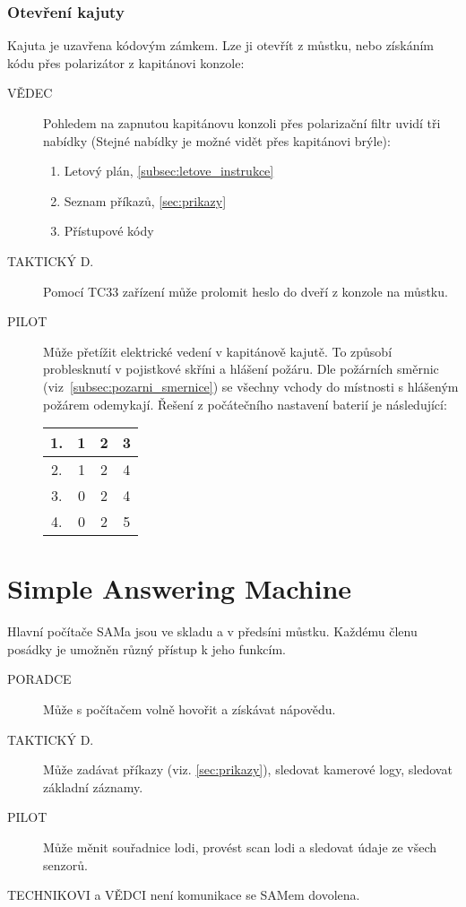 \documentclass[11pt,oneside,a4paper]{article}
\begin{document}
\subsubsection{\texorpdfstring{Otevření kajuty}{Otevreni kajuty}}
\label{subsubsec:otevreni_kajuty}
Kajuta je uzavřena kódovým zámkem. Lze ji otevřít z můstku, nebo získáním kódu přes polarizátor z kapitánovi konzole:
\begin{description}
\item[VĚDEC] Pohledem na zapnutou kapitánovu konzoli přes polarizační filtr uvidí tři nabídky (Stejné nabídky je možné vidět přes kapitánovi brýle):
\begin{enumerate}
\item Letový plán, \ref{subsec:letove_instrukce}
\item Seznam příkazů, \ref{sec:prikazy}
\item Přístupové kódy
\end{enumerate}
\item[TAKTICKÝ D.] Pomocí TC33 zařízení může prolomit heslo do dveří z konzole na můstku.
\item[PILOT] Může přetížit elektrické vedení v kapitánově kajutě. To způsobí problesknutí v pojistkové skříni a hlášení požáru. Dle požárních směrnic (viz~\ref{subsec:pozarni_smernice}) se všechny vchody do místnosti s hlášeným požárem odemykají. Řešení z počátečního nastavení baterií je následující:
\begin{center}
	\begin{tabular}{ c | c | c | c }
	\hline \hline
		1. & 1 & 2 & 3 \\ \hline
		2. & 1 & 2 & 4 \\ \hline
		3. & 0 & 2 & 4 \\ \hline
		4. & 0 & 2 & 5 \\ \hline \hline
	\end{tabular}
\end{center}
\end{description}

\section{\texorpdfstring{Simple Answering Machine}{Simple Answering Machine}}
\label{sec:SAM}

Hlavní počítače SAMa jsou ve skladu a v předsíni můstku. Každému členu posádky je umožněn různý přístup k jeho funkcím.

\begin{description}
\item[PORADCE] Může s počítačem volně hovořit a získávat nápovědu.
\item[TAKTICKÝ D.] Může zadávat příkazy (viz. \ref{sec:prikazy}), sledovat kamerové logy, sledovat základní záznamy.
\item[PILOT] Může měnit souřadnice lodi, provést scan lodi a sledovat údaje ze všech senzorů.
\end{description}
TECHNIKOVI a VĚDCI není komunikace se SAMem dovolena.
\end{document}
